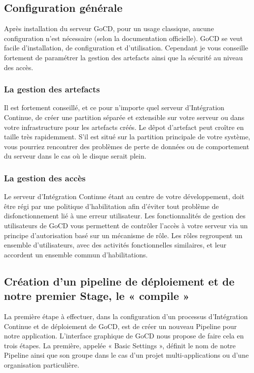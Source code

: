       \subsection{Configuration générale}
      Après installation du serveur GoCD, pour un usage classique, aucune configuration n'est nécessaire (selon la documentation officielle). GoCD se veut facile d'installation, de configuration et d'utilisation. Cependant je vous conseille fortement de paramétrer la gestion des artefacts ainsi que la sécurité au niveau des accès.

        \subsubsection{La gestion des artefacts}
        Il est fortement conseillé, et ce pour n'importe quel serveur d'Intégration Continue, de créer une partition séparée et extensible sur votre serveur ou dans votre infrastructure pour les artefacts créés. Le dêpot d'artefact peut croître en taille très rapidemment. S'il est situé sur la partition principale de votre système, vous pourriez rencontrer des problèmes de perte de données ou de comportement du serveur dans le cas où le disque serait plein.

        \subsubsection{La gestion des accès}
        Le serveur d'Intégration Continue étant au centre de votre développement, doit être régi par une politique d'habilitation afin d'éviter tout problème de disfonctionnement lié à une erreur utilisateur. Les fonctionnalités de gestion des utilisateurs de GoCD vous permettent de contrôler l'accès à votre serveur via un principe d'autorisation basé sur un mécanisme de rôle. Les rôles regroupent un ensemble d'utilisateurs, avec des activités fonctionnelles similaires, et leur accordent un ensemble commun d'habilitations.

      \subsection{Création d'un pipeline de déploiement et de notre premier Stage, le « compile »}
      La première étape à effectuer, dans la configuration d'un processus d'Intégration Continue et de déploiement de GoCD, est de créer un nouveau Pipeline pour notre application. L'interface graphique de GoCD nous propose de faire cela en trois étapes. La première, appelée « Basic Settings », définit le nom de notre Pipeline ainsi que son groupe dans le cas d'un projet multi-applications ou d'une organisation particulière.\\

